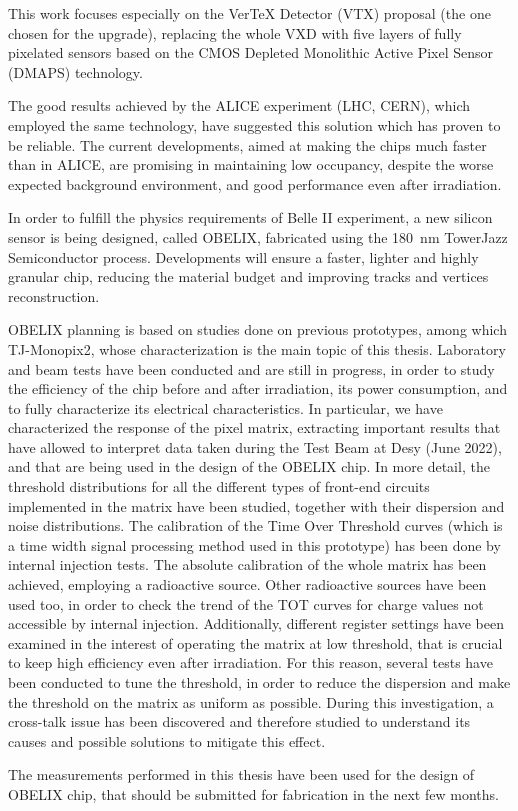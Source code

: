\documentclass[10pt,a4paper]{report}
\begin{document}
This work focuses especially on the VerTeX Detector (VTX) proposal (the one chosen for the upgrade), replacing the whole VXD with five layers of fully pixelated sensors based on the CMOS Depleted Monolithic Active Pixel Sensor (DMAPS) technology.

The good results achieved by the ALICE experiment (LHC, CERN), which employed the same technology, have suggested this solution which has proven to be reliable. The current developments, aimed at making the chips much faster than in ALICE, are promising in maintaining low occupancy, despite the worse expected background environment, and good performance even after irradiation. 

In order to fulfill the physics requirements of Belle II experiment, a new silicon sensor is being designed, called OBELIX, fabricated using the \SI{180}{nm} TowerJazz Semiconductor process. Developments will ensure a faster, lighter and highly granular chip, reducing the material budget and improving tracks and vertices reconstruction. 

OBELIX planning is based on studies done on previous prototypes, among which TJ-Monopix2, whose characterization is the main topic of this thesis. Laboratory and beam tests have been conducted and are still in progress, in order to study the efficiency of the chip before and after irradiation, its power consumption, and to fully characterize its electrical characteristics. 
In particular, we have characterized the response of the pixel matrix, extracting important results that have allowed to interpret data taken during the Test Beam at Desy (June 2022), and that are being used in the design of the OBELIX chip. 
In more detail, the threshold distributions for all the different types of front-end circuits implemented in the matrix have been studied, together with their dispersion and noise distributions. 
The calibration of the Time Over Threshold curves (which is a time width signal processing method used in this prototype) has been done by internal injection tests. The absolute calibration of the whole matrix has been achieved, employing a  radioactive source. Other radioactive sources have been used too, in order to check the trend of the TOT curves for charge values not accessible by internal injection. 
Additionally, different register settings have been examined in the interest of operating the matrix at low threshold, that is crucial to keep high efficiency even after irradiation. For this reason, several tests have been conducted to tune the threshold, in order to reduce the dispersion and make the threshold on the matrix as uniform as possible.
During this investigation, a cross-talk issue has been discovered and therefore studied to understand its causes and possible solutions to mitigate this effect.

The measurements performed in this thesis have been used for the design of OBELIX chip, that should be submitted for fabrication in the next few months.
\end{document}

